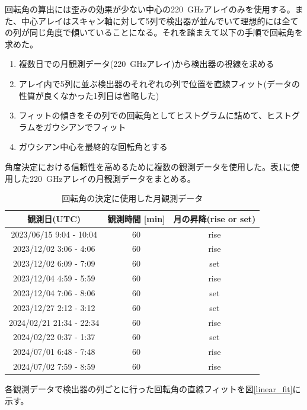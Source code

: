 回転角の算出には歪みの効果が少ない中心の\SI{220}{GHz}アレイのみを使用する。また、中心アレイはスキャン軸に対して5列で検出器が並んでいて理想的には全ての列が同じ角度で傾いていることになる。それを踏まえて以下の手順で回転角を求めた。
\begin{enumerate}
  \item 複数日での月観測データ(\SI{220}{GHz}アレイ)から検出器の視線を求める
  \item アレイ内で5列に並ぶ検出器のそれぞれの列で位置を直線フィット(データの性質が良くなかった1列目は省略した)
  \item フィットの傾きをその列での回転角としてヒストグラムに詰めて、ヒストグラムをガウシアンでフィット
  \item ガウシアン中心を最終的な回転角とする
\end{enumerate}
角度決定における信頼性を高めるために複数の観測データを使用した。表\ref{angle_cal_tods}に使用した\SI{220}{GHz}アレイの月観測データをまとめる。
\begin{table}[htbp]
  \centering
  \caption{回転角の決定に使用した月観測データ}
  \vspace{3mm}
  \begin{tabular}{ccc} \hline\hline
    観測日(UTC) & 観測時間 [min]  & 月の昇降(rise or set) \\ \hline
    2023/06/15 9:04 - 10:04 & 60 & rise \\
    2023/12/02 3:06 - 4:06 & 60 & rise \\
    2023/12/02 6:09 - 7:09 & 60 & set \\
    2023/12/04 4:59 - 5:59 & 60 & rise \\
    2023/12/04 7:06 - 8:06 & 60 & set \\
    2023/12/27 2:12 - 3:12 & 60 & set \\
    2024/02/21 21:34 - 22:34 & 60 & rise \\
    2024/02/22 0:37 - 1:37 & 60 & set \\
    2024/07/01 6:48 - 7:48 & 60 & rise \\
    2024/07/02 7:59 - 8:59 & 60 & rise \\ \hline\hline

  \end{tabular}
  \label{angle_cal_tods}
\end{table}
各観測データで検出器の列ごとに行った回転角の直線フィットを図\ref{linear_fit}に示す。
